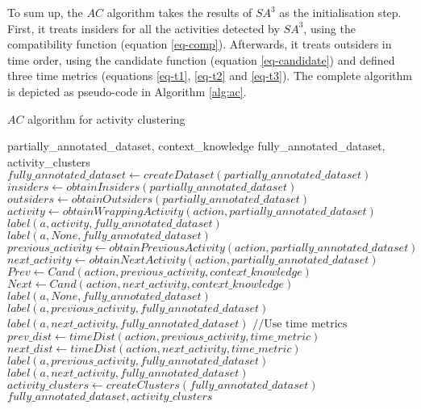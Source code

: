 To sum up, the $AC$ algorithm takes the results of $SA^3$ as the initialisation step. First, it treats insiders for all the activities detected by $SA^3$, using the compatibility function (equation \ref{eq-comp}). Afterwards, it treats outsiders in time order, using the candidate function (equation \ref{eq-candidate}) and defined three time metrics (equations \ref{eq-t1}, \ref{eq-t2} and \ref{eq-t3}). The complete algorithm is depicted as pseudo-code in Algorithm \ref{alg:ac}.

\begin{algorithm}
 \caption{$AC$ algorithm for activity clustering}
 \label{alg:ac}
 \begin{algorithmic}
 \REQUIRE partially\_annotated\_dataset, context\_knowledge
 \ENSURE fully\_annotated\_dataset, activity\_clusters
 \STATE $fully\_annotated\_dataset \leftarrow createDataset(partially\_annotated\_dataset)$
 \STATE $insiders \leftarrow obtainInsiders(partially\_annotated\_dataset)$
 \STATE $outsiders \leftarrow obtainOutsiders(partially\_annotated\_dataset)$ 
  \STATE $activity \leftarrow obtainWrappingActivity(action, partially\_annotated\_dataset)$
    \STATE $label(a, activity, fully\_annotated\_dataset)$
  \ELSE
    \STATE $label(a, None, fully\_annotated\_dataset)$
  \ENDIF
 \ENDFOR 
  \STATE $previous\_activity \leftarrow obtainPreviousActivity(action, partially\_annotated\_dataset)$
  \STATE $next\_activity \leftarrow obtainNextActivity(action, partially\_annotated\_dataset)$
  \STATE $Prev \leftarrow Cand(action, previous\_activity, context\_knowledge)$
  \STATE $Next \leftarrow Cand(action, next\_activity, context\_knowledge)$
    \STATE $label(a, None, fully\_annotated\_dataset)$
    \STATE $label(a, previous\_activity, fully\_annotated\_dataset)$
    \STATE $label(a, next\_activity, fully\_annotated\_dataset)$
    \STATE $// \text{Use time metrics}$
    \STATE $prev\_dist \leftarrow timeDist(action, previous\_activity, time\_metric)$
    \STATE $next\_dist \leftarrow timeDist(action, next\_activity, time\_metric)$
      \STATE $label(a, previous\_activity, fully\_annotated\_dataset)$
    \ELSE
      \STATE $label(a, next\_activity, fully\_annotated\_dataset)$
    \ENDIF
  \ENDIF  
 \ENDFOR
 \STATE $activity\_clusters \leftarrow createClusters(fully\_annotated\_dataset)$
 \RETURN $fully\_annotated\_dataset, activity\_clusters$
 \end{algorithmic}
\end{algorithm}

